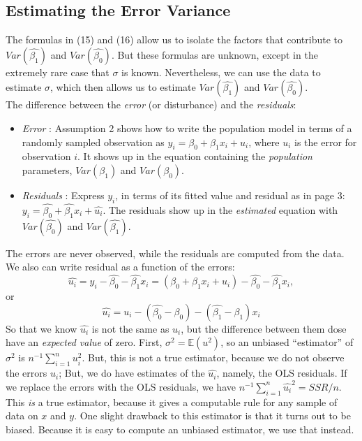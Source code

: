 \documentclass[a4paper, 10pt]{article}
\theoremstyle{definition}	%
\begin{document}
\subsection{Estimating the Error Variance}
The formulas in (15) and (16) allow us to isolate the factors that contribute to $Var(\hat{\beta_1})$ and $Var(\hat{\beta_0})$. But these formulas are unknown, except in the extremely rare case that $\sigma$ is known. Nevertheless, we can use the data to estimate $\sigma$, which then allows us to estimate $Var(\hat{\beta_1})$ and $Var(\hat{\beta_0})$.\\
The difference between the \textit{error} (or disturbance) and the \textit{residuals}:
\begin{itemize}
    \item \textit{Error} : Assumption 2 shows how to write the population model in terms of a randomly sampled observation as $y_i = \beta_0 + \beta_1 x_i + u_i$, where $u_i$ is the error for observation $i$. It shows up in the equation containing the \textit{population} parameters, $Var(\beta_1)$ and $Var(\beta_0)$.
    \item \textit{Residuals} : Express $y_i$, in terms of its fitted value and residual as in page 3: $y_i = \hat{\beta_0} + \hat{\beta_1}x_i + \hat{u_i}$. The residuals show up in the \textit{estimated} equation with $Var(\hat{\beta_0})$ and $Var(\hat{\beta_1})$.
\end{itemize}
The errors are never observed, while the residuals are computed from the data. We also can write residual as a function of the errors:
\begin{equation*}
    \hat{u_i} = y_i - \hat{\beta_0} - \hat{\beta_1}x_i = (\beta_0 + \beta_1 x_i + u_i) - \hat{\beta_0} - \hat{\beta_1}x_i,
\end{equation*}
or
\begin{equation}
    \hat{u_i} = u_i - (\hat{\beta_0} - \beta_0) - (\hat{\beta_1} - \beta_1)x_i
\end{equation}
So that we know $\hat{u_i}$ is not the same as $u_i$, but the difference between them dose have an \textit{expected value} of zero. First, $\sigma^2 = \mathbb{E}(u^2)$, so an unbiased ``estimator'' of $\sigma^2$ is $n^{-1}\sum_{i=1}^{n}u_i^2$. But, this is not a true estimator, because we do not observe the errors $u_i$; But, we do have estimates of the $\hat{u_i}$, namely, the OLS residuals. If we replace the errors with the OLS residuals, we have $n^{-1}\sum_{i=1}^{n}\hat{u_i}^2 = SSR/n$. This \textit{is} a true estimator, because it gives a computable rule for any sample of data on $x$ and $y$. One slight drawback to this estimator is that it turns out to be biased. Because it is easy to compute an unbiased estimator, we use that instead.\\
\end{document}

